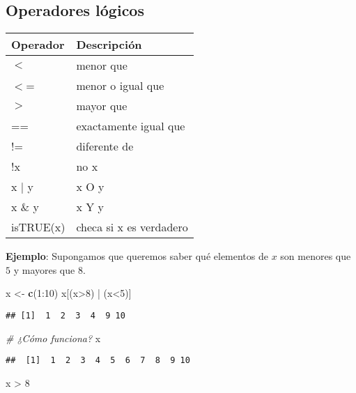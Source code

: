 \documentclass[]{article}
\newenvironment{Shaded}{\begin{snugshade}}{\end{snugshade}}
\newcommand{\KeywordTok}[1]{\textcolor[rgb]{0.13,0.29,0.53}{\textbf{{#1}}}}
\newcommand{\DecValTok}[1]{\textcolor[rgb]{0.00,0.00,0.81}{{#1}}}
\newcommand{\StringTok}[1]{\textcolor[rgb]{0.31,0.60,0.02}{{#1}}}
\newcommand{\CommentTok}[1]{\textcolor[rgb]{0.56,0.35,0.01}{\textit{{#1}}}}
\newcommand{\NormalTok}[1]{{#1}}
\begin{document}
\subsection{Operadores lógicos}\label{operadores-logicos}

\begin{table}[ht]
\centering
\begin{tabular}{ll}
  \hline
Operador & Descripción \\ 
  \hline
$<$ & menor que \\ 
  $<$= & menor o igual que \\ 
  $>$ & mayor que \\ 
  == & exactamente igual que \\ 
  != & diferente de \\ 
  !x &  no x \\ 
  x $|$ y & x O y \\ 
  x \& y & x Y y \\ 
  isTRUE(x) & checa si x es verdadero \\ 
   \hline
\end{tabular}
\end{table}

\textbf{Ejemplo}: Supongamos que queremos saber qué elementos de \(x\)
son menores que \(5\) y mayores que \(8\).

\begin{Shaded}
\begin{Highlighting}[]
\NormalTok{x <-}\StringTok{ }\KeywordTok{c}\NormalTok{(}\DecValTok{1}\NormalTok{:}\DecValTok{10}\NormalTok{)}
\NormalTok{x[(x>}\DecValTok{8}\NormalTok{) |}\StringTok{ }\NormalTok{(x<}\DecValTok{5}\NormalTok{)]}
\end{Highlighting}
\end{Shaded}

\begin{verbatim}
## [1]  1  2  3  4  9 10
\end{verbatim}

\begin{Shaded}
\begin{Highlighting}[]
\CommentTok{# ¿Cómo funciona?}
\NormalTok{x}
\end{Highlighting}
\end{Shaded}

\begin{verbatim}
##  [1]  1  2  3  4  5  6  7  8  9 10
\end{verbatim}

\begin{Shaded}
\begin{Highlighting}[]
\NormalTok{x >}\StringTok{ }\DecValTok{8}
\end{Highlighting}
\end{Shaded}
\end{document}
